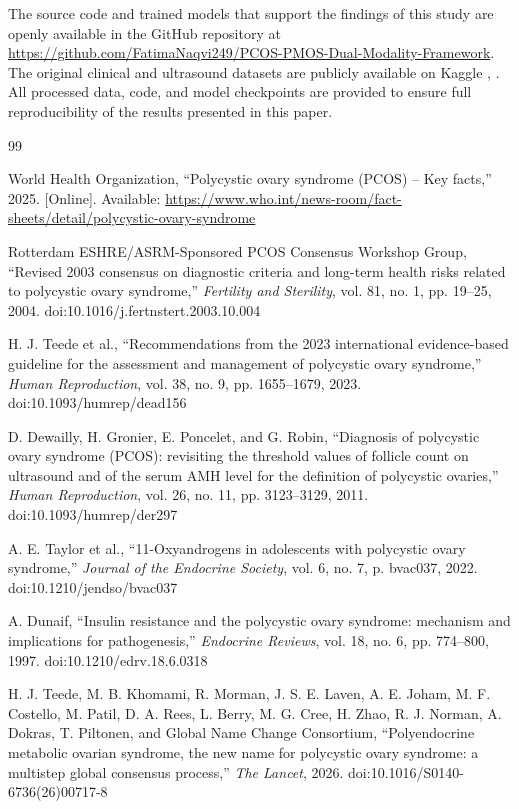 \documentclass[conference]{IEEEtran}
\begin{document}
The source code and trained models that support the findings of this study are openly available in the GitHub repository at \url{https://github.com/FatimaNaqvi249/PCOS-PMOS-Dual-Modality-Framework}. The original clinical and ultrasound datasets are publicly available on Kaggle \cite{PCOSclinicalKaggle}, \cite{PCOSultrasoundKaggle}. All processed data, code, and model checkpoints are provided to ensure full reproducibility of the results presented in this paper.

\begin{thebibliography}{99}

World Health Organization, ``Polycystic ovary syndrome (PCOS) -- Key facts,'' 2025. [Online]. Available: \url{https://www.who.int/news-room/fact-sheets/detail/polycystic-ovary-syndrome}

Rotterdam ESHRE/ASRM-Sponsored PCOS Consensus Workshop Group, ``Revised 2003 consensus on diagnostic criteria and long-term health risks related to polycystic ovary syndrome,'' \textit{Fertility and Sterility}, vol. 81, no. 1, pp. 19--25, 2004. doi:10.1016/j.fertnstert.2003.10.004

H. J. Teede et al., ``Recommendations from the 2023 international evidence-based guideline for the assessment and management of polycystic ovary syndrome,'' \textit{Human Reproduction}, vol. 38, no. 9, pp. 1655--1679, 2023. doi:10.1093/humrep/dead156

D. Dewailly, H. Gronier, E. Poncelet, and G. Robin, ``Diagnosis of polycystic ovary syndrome (PCOS): revisiting the threshold values of follicle count on ultrasound and of the serum AMH level for the definition of polycystic ovaries,'' \textit{Human Reproduction}, vol. 26, no. 11, pp. 3123--3129, 2011. doi:10.1093/humrep/der297

A. E. Taylor et al., ``11-Oxyandrogens in adolescents with polycystic ovary syndrome,'' \textit{Journal of the Endocrine Society}, vol. 6, no. 7, p. bvac037, 2022. doi:10.1210/jendso/bvac037

A. Dunaif, ``Insulin resistance and the polycystic ovary syndrome: mechanism and implications for pathogenesis,'' \textit{Endocrine Reviews}, vol. 18, no. 6, pp. 774--800, 1997. doi:10.1210/edrv.18.6.0318

H. J. Teede, M. B. Khomami, R. Morman, J. S. E. Laven, A. E. Joham, M. F. Costello, M. Patil, D. A. Rees, L. Berry, M. G. Cree, H. Zhao, R. J. Norman, A. Dokras, T. Piltonen, and Global Name Change Consortium, ``Polyendocrine metabolic ovarian syndrome, the new name for polycystic ovary syndrome: a multistep global consensus process,'' \textit{The Lancet}, 2026. doi:10.1016/S0140-6736(26)00717-8


\end{thebibliography}
\end{document}

